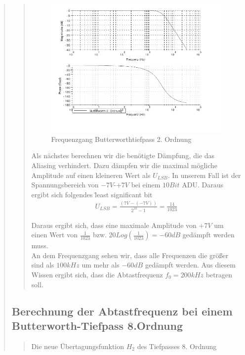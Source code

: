\begin{quote}
\begin{quote}
        \begin{figure}[H]
			\centering
				\includegraphics[scale=1]{Frequenzgang}
				   \caption{Frequenzgang Butterworthtiefpass 2. Ordnung}
		\end{figure}
		\vspace{1em}
	 	
	   Als nächstes berechnen wir die benötigte Dämpfung, die das Aliasing verhindert. Dazu dämpfen wir die maximal
	   mögliche Amplitude auf einen kleineren Wert als $U_{LSB}$. In unserem Fall ist der Spannungsbereich von $-7V$-$+7V$
	   bei einem $10Bit$ ADU. Daraus ergibt sich folgendes \"least significant bit\"
	   
	   \begin{equation*}
        	\begin{split}
        		U_{LSB} = \frac{(7V-(-7V))}{2^{10}-1} = \frac{14}{1023}
        	\end{split}
        \end{equation*}
        
        Daraus ergibt sich, dass eine maximale Amplitude von $+7V$ um einen Wert von $\frac{1}{1023}$ bzw. $20
        Log(\frac{1}{1023}) = -60 dB$ gedämpft werden muss. \\
        An dem Frequenzgang sehen wir, dass alle Frequenzen die größer sind als $100kHz$ um mehr als $-60 dB$ gedämpft
        werden. Aus diesem Wissen ergibt sich, dass die Abtastfrequenz $f_0 = 200kHz$ betragen soll.
        
    \end{quote}
    
    \subsection{Berechnung der Abtastfrequenz bei einem Butterworth-Tiefpass 8.Ordnung}
    \begin{quote}
        Die neue Übertagungsfunktion $H_2$ des Tiefpasses 8. Ordnung
        

\end{quote}
\end{quote}
